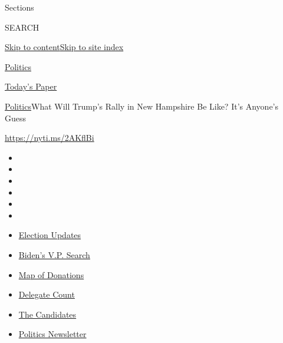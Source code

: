 Sections

SEARCH

\protect\hyperlink{site-content}{Skip to
content}\protect\hyperlink{site-index}{Skip to site index}

\href{https://www.nytimes.com/section/politics}{Politics}

\href{https://myaccount.nytimes.com/auth/login?response_type=cookie\&client_id=vi}{}

\href{https://www.nytimes.com/section/todayspaper}{Today's Paper}

\href{/section/politics}{Politics}\textbar{}What Will Trump's Rally in
New Hampshire Be Like? It's Anyone's Guess

\url{https://nyti.ms/2AKflBi}

\begin{itemize}
\item
\item
\item
\item
\item
\item
\end{itemize}

\begin{itemize}
\item
  \href{https://www.nytimes.com/2020/08/03/us/elections/biden-vs-trump.html?action=click\&pgtype=Article\&state=default\&region=TOP_BANNER\&context=storylines_menu}{Election
  Updates}
\item
  \href{https://www.nytimes.com/article/biden-vice-president-2020.html?action=click\&pgtype=Article\&state=default\&region=TOP_BANNER\&context=storylines_menu}{Biden's
  V.P. Search}
\item
  \href{https://www.nytimes.com/interactive/2020/07/24/us/politics/trump-biden-campaign-donors.html?action=click\&pgtype=Article\&state=default\&region=TOP_BANNER\&context=storylines_menu}{Map
  of Donations}
\item
  \href{https://www.nytimes.com/interactive/2020/us/elections/delegate-count-primary-results.html?action=click\&pgtype=Article\&state=default\&region=TOP_BANNER\&context=storylines_menu}{Delegate
  Count}
\item
  \href{https://www.nytimes.com/interactive/2019/us/politics/2020-presidential-candidates.html?action=click\&pgtype=Article\&state=default\&region=TOP_BANNER\&context=storylines_menu}{The
  Candidates}
\item
  \href{https://www.nytimes.com/newsletters/politics?action=click\&pgtype=Article\&state=default\&region=TOP_BANNER\&context=storylines_menu}{Politics
  Newsletter}
\end{itemize}

